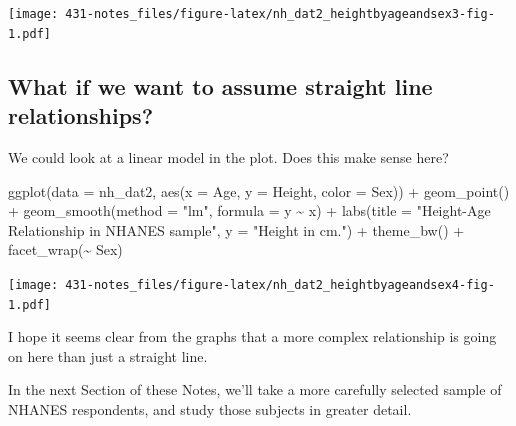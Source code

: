 \documentclass[
]{book}
\newenvironment{Shaded}{\begin{snugshade}}{\end{snugshade}}
\newcommand{\AttributeTok}[1]{\textcolor[rgb]{0.77,0.63,0.00}{#1}}
\newcommand{\FunctionTok}[1]{\textcolor[rgb]{0.00,0.00,0.00}{#1}}
\newcommand{\NormalTok}[1]{#1}
\newcommand{\SpecialCharTok}[1]{\textcolor[rgb]{0.00,0.00,0.00}{#1}}
\newcommand{\StringTok}[1]{\textcolor[rgb]{0.31,0.60,0.02}{#1}}
\begin{document}
\texttt{[image: 431-notes\_files/figure-latex/nh\_dat2\_heightbyageandsex3-fig-1.pdf]}

\hypertarget{what-if-we-want-to-assume-straight-line-relationships}{%
\subsection{What if we want to assume straight line relationships?}\label{what-if-we-want-to-assume-straight-line-relationships}}

We could look at a linear model in the plot. Does this make sense here?

\begin{Shaded}
\begin{Highlighting}[]
\FunctionTok{ggplot}\NormalTok{(}\AttributeTok{data =}\NormalTok{ nh\_dat2, }\FunctionTok{aes}\NormalTok{(}\AttributeTok{x =}\NormalTok{ Age, }\AttributeTok{y =}\NormalTok{ Height, }\AttributeTok{color =}\NormalTok{ Sex)) }\SpecialCharTok{+}
    \FunctionTok{geom\_point}\NormalTok{() }\SpecialCharTok{+} 
    \FunctionTok{geom\_smooth}\NormalTok{(}\AttributeTok{method =} \StringTok{"lm"}\NormalTok{, }\AttributeTok{formula =}\NormalTok{ y }\SpecialCharTok{\textasciitilde{}}\NormalTok{ x) }\SpecialCharTok{+}
    \FunctionTok{labs}\NormalTok{(}\AttributeTok{title =} \StringTok{"Height{-}Age Relationship in NHANES sample"}\NormalTok{, }
         \AttributeTok{y =} \StringTok{"Height in cm."}\NormalTok{) }\SpecialCharTok{+}
    \FunctionTok{theme\_bw}\NormalTok{() }\SpecialCharTok{+}
    \FunctionTok{facet\_wrap}\NormalTok{(}\SpecialCharTok{\textasciitilde{}}\NormalTok{ Sex)}
\end{Highlighting}
\end{Shaded}

\texttt{[image: 431-notes\_files/figure-latex/nh\_dat2\_heightbyageandsex4-fig-1.pdf]}

I hope it seems clear from the graphs that a more complex relationship is going on here than just a straight line.

In the next Section of these Notes, we'll take a more carefully selected sample of NHANES respondents, and study those subjects in greater detail.

  
\end{document}
